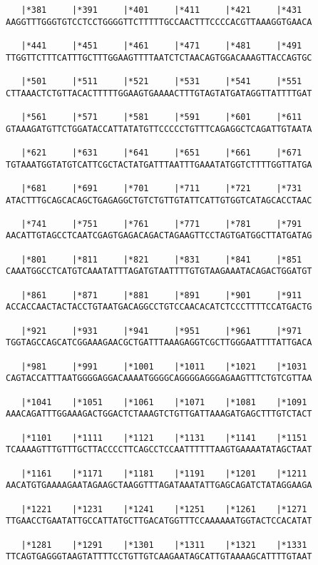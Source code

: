 \documentclass{article}
\begin{document}
\begin{Verbatim}
   |*381     |*391     |*401     |*411     |*421     |*431  
AAGGTTTGGGTGTCCTCCTGGGGTTCTTTTTGCCAACTTTCCCCACGTTAAAGGTGAACA
  
   |*441     |*451     |*461     |*471     |*481     |*491  
TTGGTTCTTTCATTTGCTTTGGAAGTTTTAATCTCTAACAGTGGACAAAGTTACCAGTGC
  
   |*501     |*511     |*521     |*531     |*541     |*551  
CTTAAACTCTGTTACACTTTTTGGAAGTGAAAACTTTGTAGTATGATAGGTTATTTTGAT
  
   |*561     |*571     |*581     |*591     |*601     |*611  
GTAAAGATGTTCTGGATACCATTATATGTTCCCCCTGTTTCAGAGGCTCAGATTGTAATA
  
   |*621     |*631     |*641     |*651     |*661     |*671  
TGTAAATGGTATGTCATTCGCTACTATGATTTAATTTGAAATATGGTCTTTTGGTTATGA
  
   |*681     |*691     |*701     |*711     |*721     |*731  
ATACTTTGCAGCACAGCTGAGAGGCTGTCTGTTGTATTCATTGTGGTCATAGCACCTAAC
  
   |*741     |*751     |*761     |*771     |*781     |*791  
AACATTGTAGCCTCAATCGAGTGAGACAGACTAGAAGTTCCTAGTGATGGCTTATGATAG
  
   |*801     |*811     |*821     |*831     |*841     |*851  
CAAATGGCCTCATGTCAAATATTTAGATGTAATTTTGTGTAAGAAATACAGACTGGATGT
  
   |*861     |*871     |*881     |*891     |*901     |*911  
ACCACCAACTACTACCTGTAATGACAGGCCTGTCCAACACATCTCCCTTTTCCATGACTG
  
   |*921     |*931     |*941     |*951     |*961     |*971  
TGGTAGCCAGCATCGGAAAGAACGCTGATTTAAAGAGGTCGCTTGGGAATTTTATTGACA
  
   |*981     |*991     |*1001    |*1011    |*1021    |*1031 
CAGTACCATTTAATGGGGAGGACAAAATGGGGCAGGGGAGGGAGAAGTTTCTGTCGTTAA
  
   |*1041    |*1051    |*1061    |*1071    |*1081    |*1091 
AAACAGATTTGGAAAGACTGGACTCTAAAGTCTGTTGATTAAAGATGAGCTTTGTCTACT
  
   |*1101    |*1111    |*1121    |*1131    |*1141    |*1151 
TCAAAAGTTTGTTTGCTTACCCCTTCAGCCTCCAATTTTTTAAGTGAAAATATAGCTAAT
  
   |*1161    |*1171    |*1181    |*1191    |*1201    |*1211 
AACATGTGAAAAGAATAGAAGCTAAGGTTTAGATAAATATTGAGCAGATCTATAGGAAGA
  
   |*1221    |*1231    |*1241    |*1251    |*1261    |*1271 
TTGAACCTGAATATTGCCATTATGCTTGACATGGTTTCCAAAAAATGGTACTCCACATAT
  
   |*1281    |*1291    |*1301    |*1311    |*1321    |*1331 
TTCAGTGAGGGTAAGTATTTTCCTGTTGTCAAGAATAGCATTGTAAAAGCATTTTGTAAT
  

\end{Verbatim}
\end{document}
